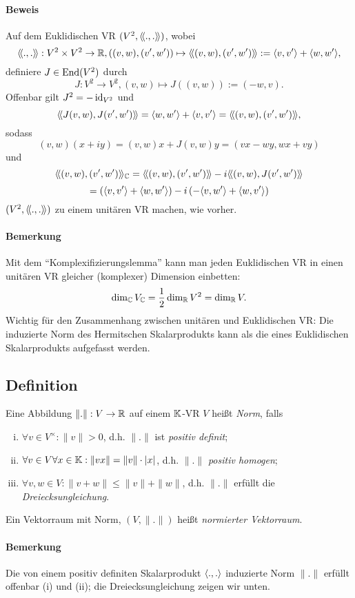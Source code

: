 \paragraph{Beweis}
	Auf dem Euklidischen VR $ (V^2,\langle\! \langle .,. \rangle\! \rangle) $, wobei
		\[ \langle\! \langle .,. \rangle\! \rangle:V^2\times V^2 \to \mathbb{R}, \left((v,w),(v',w')\right)\mapsto \langle\! \langle (v,w),(v',w') \rangle\! \rangle := \langle v,v' \rangle+\langle w,w' \rangle, \]
	definiere $ J\in \operatorname{End}(V^2) $ durch
		\[ J:V^2 \to V^2, (v,w)\mapsto J\left((v,w)\right):= (-w,v). \]
	Offenbar gilt $ J^2 = -\operatorname{id}_{V^2} $ und
		\[ \langle\! \langle J(v,w),J(v',w') \rangle\! \rangle = \langle w,w' \rangle+\langle v,v' \rangle = \langle\! \langle (v,w),(v',w') \rangle\! \rangle, \]
	sodass
		\[ (v,w)(x+iy) = (v,w)x+J(v,w)y= (vx-wy,wx+vy) \]
	und
		\[ \langle\! \langle (v,w),(v',w') \rangle\! \rangle_{\mathbb{C}} = \langle\! \langle (v,w),(v',w') \rangle\! \rangle-i\langle\! \langle (v,w),J(v',w') \rangle\! \rangle  \]
		\[ = \left(\langle v,v' \rangle+\langle w,w' \rangle\right) -i\left(-\langle v,w' \rangle+\langle w,v' \rangle\right) \]
	$ (V^2,\langle\! \langle .,. \rangle\! \rangle) $ zu einem unitären VR machen, wie vorher.
\paragraph{Bemerkung}
	Mit dem "`Komplexifizierungslemma"' kann man jeden Euklidischen VR in einen unitären VR gleicher (komplexer) Dimension einbetten:
		\[ \dim_{\mathbb{C}} V_{\mathbb{C}} = \frac{1}{2}\dim_{\mathbb{R}} V^2 = \dim_{\mathbb{R}} V. \]
	Wichtig für den Zusammenhang zwischen unitären und Euklidischen VR:
	Die induzierte Norm des Hermitschen Skalarprodukts kann als die eines Euklidischen Skalarprodukts aufgefasst werden.
	
\subsection{Definition}
\begin{Definition}
	Eine Abbildung $ \|.\|:V\to \mathbb{R} $ auf einem $ \mathbb{K} $-VR $ V $ heißt \emph{Norm}, falls
	\begin{enumerate}[(i)]
		\item $ \forall v\in V^\times: \|v\| > 0 $, d.h. $ \|.\| $ ist \emph{positiv definit};
		\item $ \forall v\in V \forall x\in \mathbb{K}: \|vx\| = \|v\|\cdot |x| $, d.h. $ \|.\| $ \emph{positiv homogen};
		\item $ \forall v,w\in V: \| v+w\|\leq \|v\| + \|w\| $, d.h. $ \|.\| $ erfüllt die \emph{Dreiecksungleichung}.
	\end{enumerate}
	Ein Vektorraum mit Norm, $ (V,\|.\|) $ heißt \emph{normierter Vektorraum}.
\end{Definition}

\paragraph{Bemerkung}
	Die von einem positiv definiten Skalarprodukt $ \langle .,. \rangle $ induzierte Norm $ \|.\| $ erfüllt offenbar (i) und (ii); die Dreiecksungleichung zeigen wir unten.
